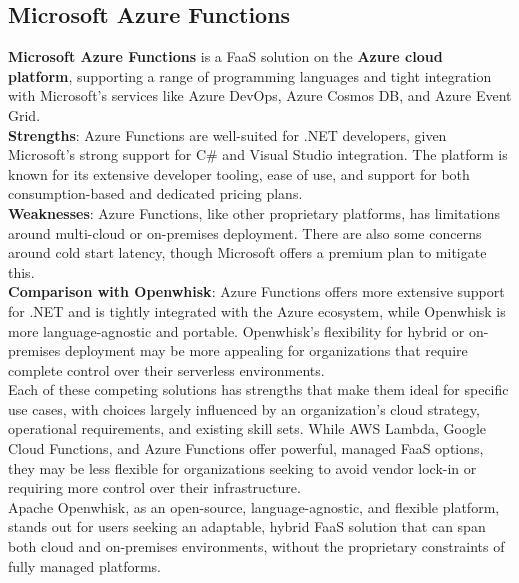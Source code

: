 \subsection{Microsoft Azure Functions}
\textbf{Microsoft Azure Functions} is a FaaS solution on the \textbf{Azure cloud platform}, supporting a range of programming languages and tight integration with Microsoft’s services like Azure DevOps, Azure Cosmos DB, and Azure Event Grid.\vspace{14pt}\\
\textbf{Strengths}: Azure Functions are well-suited for .NET developers, given Microsoft’s strong support for C\# and Visual Studio integration. The platform is known for its extensive developer tooling, ease of use, and support for both consumption-based and dedicated pricing plans.\vspace{14pt}\\
\textbf{Weaknesses}: Azure Functions, like other proprietary platforms, has limitations around multi-cloud or on-premises deployment. There are also some concerns around cold start latency, though Microsoft offers a premium plan to mitigate this.\vspace{14pt}\\
\textbf{Comparison with Openwhisk}: Azure Functions offers more extensive support for .NET and is tightly integrated with the Azure ecosystem, while Openwhisk is more language-agnostic and portable. Openwhisk’s flexibility for hybrid or on-premises deployment may be more appealing for organizations that require complete control over their serverless environments.\vspace{20pt}\\
Each of these competing solutions has strengths that make them ideal for specific use cases, with choices largely influenced by an organization’s cloud strategy, operational requirements, and existing skill sets. While AWS Lambda, Google Cloud Functions, and Azure Functions offer powerful, managed FaaS options, they may be less flexible for organizations seeking to avoid vendor lock-in or requiring more control over their infrastructure.\vspace{14pt}\\
Apache Openwhisk, as an open-source, language-agnostic, and flexible platform, stands out for users seeking an adaptable, hybrid FaaS solution that can span both cloud and on-premises environments, without the proprietary constraints of fully managed platforms.